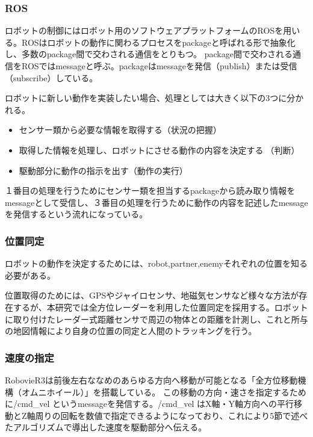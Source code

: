 \documentclass{kuisthesis}
\begin{document}
\subsubsection*{ROS}
ロボットの制御にはロボット用のソフトウェアプラットフォームのROSを用いる。ROSはロボットの動作に関わるプロセスをpackageと呼ばれる形で抽象化し、多数のpackage間で交わされる通信をとりもつ。
package間で交わされる通信をROSではmessageと呼ぶ。packageはmessageを発信（publish）または受信（subscribe）している。

ロボットに新しい動作を実装したい場合、処理としては大きく以下の3つに分かれる。
\begin{itemize}
	\item センサー類から必要な情報を取得する（状況の把握）
	\item 取得した情報を処理し、ロボットにさせる動作の内容を決定する（判断）
	\item 駆動部分に動作の指示を出す（動作の実行）
\end{itemize}

１番目の処理を行うためにセンサー類を担当するpackageから読み取り情報をmessageとして受信し、３番目の処理を行うために動作の内容を記述したmessageを発信するという流れになっている。

\vspace{1.0em}

\subsubsection*{位置同定}
ロボットの動作を決定するためには、robot,partner,enemyそれぞれの位置を知る必要がある。

位置取得のためには、GPSやジャイロセンサ、地磁気センサなど様々な方法が存在するが、本研究では全方位レーダーを利用した位置同定を採用する。ロボットに取り付けたレーダー式距離センサで周辺の物体との距離を計測し、これと所与の地図情報により自身の位置の同定と人間のトラッキングを行う。

\vspace{1.0em}

\subsubsection*{速度の指定}
RobovieR3は前後左右ななめのあらゆる方向へ移動が可能となる「全方位移動機構（オムニホイール）」を搭載している。
この移動の方向・速さを指定するために/cmd\_vel というmessageを発信する。/cmd\_vel はX軸・Y軸方向への平行移動とZ軸周りの回転を数値で指定できるようになっており、これにより5節で述べたアルゴリズムで導出した速度を駆動部分へ伝える。
\end{document}
